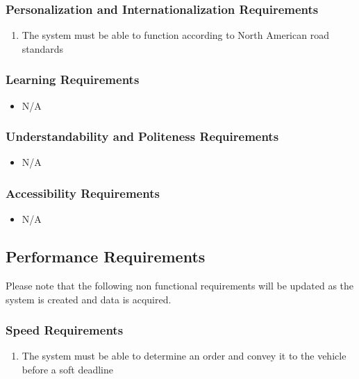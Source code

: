 \documentclass [11pt]{article}
\begin{document}
\subsubsection{Personalization and Internationalization Requirements}
	\begin{enumerate}[label=\textbf{\Alph*}:]
		\item The system must be able to function according to North American road standards
	\end{enumerate}

\subsubsection{Learning Requirements }
	\begin{itemize}
		\item N/A
	\end{itemize}

\subsubsection{Understandability and Politeness Requirements}
	\begin{itemize}
		\item N/A
	\end{itemize}
		
\subsubsection{Accessibility Requirements }
	\begin{itemize}
		\item N/A
	\end{itemize}
 
\subsection{Performance Requirements}
	Please note that the following  non functional requirements will be updated as the system is created and data is acquired.

\subsubsection{Speed Requirements }
	\begin{enumerate}[label=\textbf{\Alph*}:]
		\item The system must be able to determine an order and convey it to the vehicle before a soft deadline
	\end{enumerate}
\end{document}
